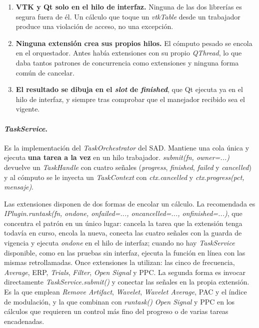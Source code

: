 \documentclass[12pt,letterpaper,oneside]{article}
\DeclareRobustCommand{\_}{\textunderscore\allowbreak}
\begin{document}
\begin{enumerate}
    \item \textbf{VTK y Qt solo en el hilo de interfaz.} Ninguna de las dos librerías es segura fuera de él. Un cálculo que toque un \textit{vtkTable} desde un trabajador produce una violación de acceso, no una excepción.
    \item \textbf{Ninguna extensión crea sus propios hilos.} El cómputo pesado se encola en el orquestador. Antes había extensiones con su propio \textit{QThread}, lo que daba tantos patrones de concurrencia como extensiones y ninguna forma común de cancelar.
    \item \textbf{El resultado se dibuja en el \textit{slot} de \textit{finished}}, que Qt ejecuta ya en el hilo de interfaz, y siempre tras comprobar que el manejador recibido sea el vigente.
\end{enumerate}

\paragraph{\textit{TaskService}.} Es la implementación del \textit{TaskOrchestrator} del SAD. Mantiene una cola única y ejecuta \textbf{una tarea a la vez} en un hilo trabajador. \textit{submit(fn, owner=...)} devuelve un \textit{TaskHandle} con cuatro señales (\textit{progress}, \textit{finished}, \textit{failed} y \textit{cancelled}) y al cómputo se le inyecta un \textit{TaskContext} con \textit{ctx.cancelled} y \textit{ctx.progress(pct, mensaje)}.

Las extensiones disponen de dos formas de encolar un cálculo. La recomendada es \textit{IPlugin.run\_task(fn, on\_done, on\_failed=..., on\_cancelled=..., on\_finished=...)}, que concentra el patrón en un único lugar: cancela la tarea que la extensión tenga todavía en curso, encola la nueva, conecta las cuatro señales con la guarda de vigencia y ejecuta \textit{on\_done} en el hilo de interfaz; cuando no hay \textit{TaskService} disponible, como en las pruebas sin interfaz, ejecuta la función en línea con las mismas retrollamadas. Once extensiones la utilizan: las cinco de frecuencia, \textit{Average}, ERP, \textit{Trials}, \textit{Filter}, \textit{Open Signal} y PPC. La segunda forma es invocar directamente \textit{TaskService.submit()} y conectar las señales en la propia extensión. Es la que emplean \textit{Remove Artifact}, \textit{Wavelet}, \textit{Wavelet Average}, PAC y el índice de modulación, y la que combinan con \textit{run\_task()} \textit{Open Signal} y PPC en los cálculos que requieren un control más fino del progreso o de varias tareas encadenadas.
\end{document}
